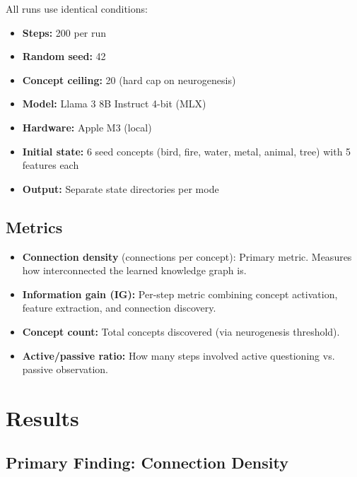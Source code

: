 \documentclass[conference]{IEEEtran}
\begin{document}
All runs use identical conditions:

\begin{itemize}[leftmargin=*]
\item \textbf{Steps:} 200 per run
\item \textbf{Random seed:} 42
\item \textbf{Concept ceiling:} 20 (hard cap on neurogenesis)
\item \textbf{Model:} Llama 3 8B Instruct 4-bit (MLX)
\item \textbf{Hardware:} Apple M3 (local)
\item \textbf{Initial state:} 6 seed concepts (bird, fire, water, metal, animal, tree) with 5 features each
\item \textbf{Output:} Separate state directories per mode
\end{itemize}

\subsection{Metrics}

\begin{itemize}[leftmargin=*]
\item \textbf{Connection density} (connections per concept): Primary metric. Measures how interconnected the learned knowledge graph is.
\item \textbf{Information gain (IG):} Per-step metric combining concept activation, feature extraction, and connection discovery.
\item \textbf{Concept count:} Total concepts discovered (via neurogenesis threshold).
\item \textbf{Active/passive ratio:} How many steps involved active questioning vs. passive observation.
\end{itemize}


\section{Results}
\label{sec:results}

\subsection{Primary Finding: Connection Density}
\end{document}
